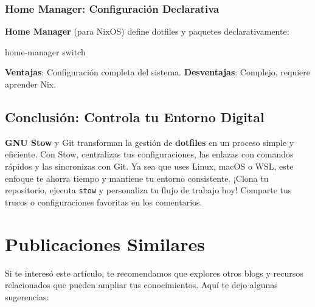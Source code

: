 \documentclass[
  jou,
  floatsintext,
  longtable,
  a4paper,
  nolmodern,
  notxfonts,
  notimes,
  colorlinks=true,linkcolor=blue,citecolor=blue,urlcolor=blue]{apa7}
\newenvironment{Shaded}{\begin{snugshade}}{\end{snugshade}}
\newcommand{\ExtensionTok}[1]{\textcolor[rgb]{0.00,0.23,0.31}{#1}}
\newcommand{\NormalTok}[1]{\textcolor[rgb]{0.00,0.23,0.31}{#1}}
\begin{document}
\subsubsection{Home Manager: Configuración
Declarativa}\label{home-manager-configuraciuxf3n-declarativa}

\textbf{Home Manager} (para NixOS) define dotfiles y paquetes
declarativamente:

\begin{Shaded}
\begin{Highlighting}[]
\ExtensionTok{home{-}manager}\NormalTok{ switch}
\end{Highlighting}
\end{Shaded}

\textbf{Ventajas}: Configuración completa del sistema.
\textbf{Desventajas}: Complejo, requiere aprender Nix.

\subsection{Conclusión: Controla tu Entorno
Digital}\label{conclusiuxf3n-controla-tu-entorno-digital}

\textbf{GNU Stow} y Git transforman la gestión de \textbf{dotfiles} en
un proceso simple y eficiente. Con Stow, centralizas tus
configuraciones, las enlazas con comandos rápidos y las sincronizas con
Git. Ya sea que uses Linux, macOS o WSL, este enfoque te ahorra tiempo y
mantiene tu entorno consistente. ¡Clona tu repositorio, ejecuta
\texttt{stow} y personaliza tu flujo de trabajo hoy! Comparte tus trucos
o configuraciones favoritas en los comentarios.

\section{Publicaciones Similares}\label{publicaciones-similares}

Si te interesó este artículo, te recomendamos que explores otros blogs y
recursos relacionados que pueden ampliar tus conocimientos. Aquí te dejo
algunas sugerencias:
\end{document}
